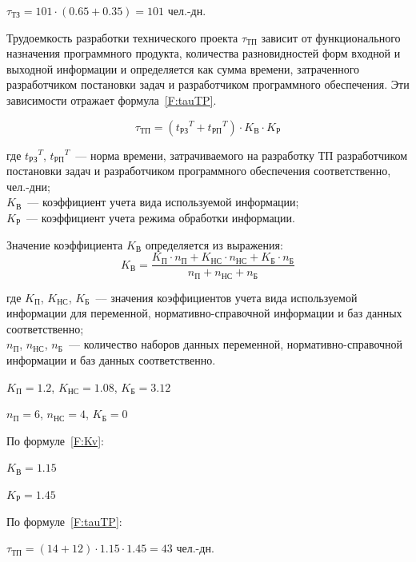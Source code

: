 $\tau_{\text{ТЗ}} = 101 \cdot (0.65 + 0.35) = 101 $ чел.-дн.

Трудоемкость разработки технического проекта $\tau_{\text{ТП}}$ зависит от функционального назначения программного продукта, количества разновидностей форм входной и выходной информации и определяется как сумма времени, затраченного разработчиком постановки задач  и разработчиком программного обеспечения. Эти зависимости отражает формула~\ref{F:tauTP}.

\begin{equation}
\tau_{\text{ТП}} = ({t_{\text{РЗ}}}^T + {t_{\text{РП}}}^T) \cdot K_{\text{В}} \cdot K_{\text{Р}}
\label{F:tauTP}
\end{equation}

где ${t_{\text{РЗ}}}^T$, ${t_{\text{РП}}}^T$~--- норма времени, затрачиваемого на разработку ТП разработчиком постановки задач и разработчиком программного обеспечения соответственно, чел.-дни; \\ $K_{\text{В}}$~--- коэффициент учета вида используемой информации; \\
$K_{\text{Р}}$~--- коэффициент учета режима обработки информации.

Значение коэффициента $K_{\text{В}}$ определяется из выражения:
\begin{equation}
K_{\text{В}} = \frac{K_{\text{П}} \cdot n_{\text{П}} + K_{\text{НС}} \cdot n_{\text{НС}} + K_{\text{Б}} \cdot n_{\text{Б}}}{n_{\text{П}} + n_{\text{НС}} + n_{\text{Б}}}
\label{F:Kv}
\end{equation}

где $K_{\text{П}}$, $K_{\text{НС}}$, $K_{\text{Б}}$~--– значения коэффициентов учета вида используемой информации для переменной, нормативно-справочной информации и баз данных соответственно; \\ $n_{\text{П}}$, $n_{\text{НС}}$, $n_{\text{Б}}$~--– количество наборов данных переменной, нормативно-справочной информации и баз данных соответственно.

$K_{\text{П}} = 1.2$, $K_{\text{НС}} = 1.08$, $K_{\text{Б}} = 3.12$

$n_{\text{П}} = 6$, $n_{\text{НС}} = 4$, $K_{\text{Б}} = 0$

По формуле~\ref{F:Kv}:

$K_{\text{В}} = 1.15$

$K_{\text{Р}} = 1.45$

По формуле~\ref{F:tauTP}:

$\tau_{\text{ТП}} = (14 + 12) \cdot 1.15 \cdot 1.45 = 43$ чел.-дн.

